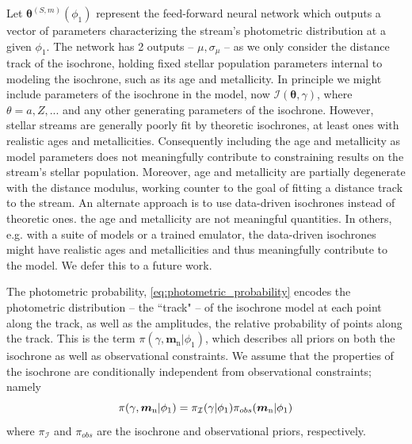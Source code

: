 \documentclass[twocolumn]{aastex631}
\newcommand{\mrm}[1]{\mathrm{#1}}
\newcommand{\mbs}[1]{\boldsymbol{#1}}
\newcommand{\mcal}[1]{\mathcal{#1}}
\newcommand{\prior}{\mcal{\pi}}
\newcommand{\nth}[1]{{#1}_{\mrm{n}}}  %
\newcommand{\smallcomponent}[2]{#2^{\scriptscriptstyle (#1)}}
\newcommand{\cmp}[2]{\smallcomponent{#1}{#2}}
\begin{document}
            Let $\cmp{S,m}{\mbs{\theta}}(\phi_1)$ represent the feed-forward neural network which outputs a vector of parameters characterizing the stream's photometric distribution at a given $\phi_1$. The network has 2 outputs -- $\mu, \sigma_\mu$ -- as we only consider the distance track of the isochrone, holding fixed stellar population parameters internal to modeling the isochrone, such as its age and metallicity.
            In principle we might include parameters of the isochrone in the model, now $\mcal{I}(\mbs{\theta}, \gamma)$, where $\theta = {a, Z, ...}$ and any other generating parameters of the isochrone.
            However, stellar streams are generally poorly fit by theoretic isochrones, at least ones with realistic ages and metallicities.
            Consequently including the age and metallicity as model parameters
            does not meaningfully contribute to constraining results on the stream's stellar population. Moreover, age and metallicity are partially degenerate with the distance modulus, working counter to the goal of fitting a distance track to the stream. An alternate approach is to use data-driven isochrones instead of theoretic ones.  the age and metallicity are not meaningful quantities. In others, e.g. with a suite of models or a trained emulator, the data-driven isochrones might have realistic ages and metallicities and thus meaningfully contribute to the model.
            We defer this to a future work.

            The photometric probability, \autoref{eq:photometric_probability} encodes the photometric distribution -- the ``track" -- of the isochrone model at each point along the track, as well as the amplitudes, the relative probability of points along the track. This is the term $\prior(\gamma, \nth{\mbs{m}} | \phi_1)$, which describes all priors on both the isochrone as well as observational constraints. We assume that the properties of the isochrone are conditionally independent from observational constraints; namely
            \begin{equation} \label{eq:isochrone_prior_components}
                \prior(\gamma, \nth{\mbs{m}} | \phi_1) = \prior_{\cal{I}}(\gamma | \phi_1) \prior_{obs}(\nth{\mbs{m}} | \phi_1)
            \end{equation}
            where $\prior_{\mcal{I}}$ and $\prior_{obs}$ are the isochrone and observational priors, respectively.
            
\end{document}
